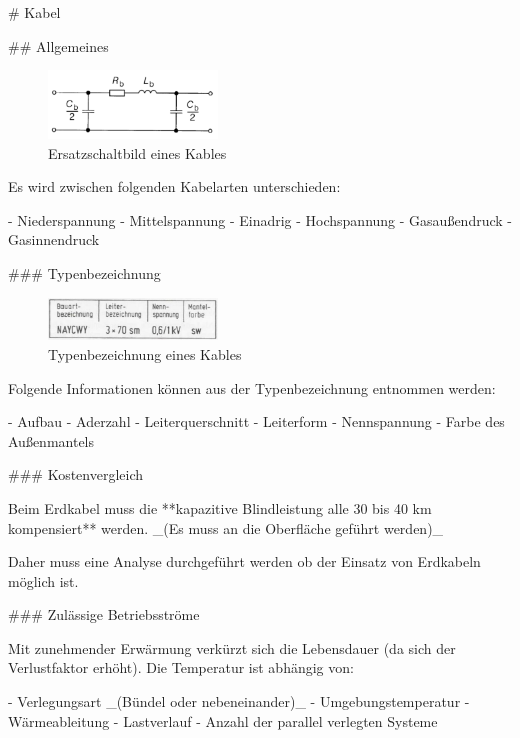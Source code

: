 \begin{markdown}
# Kabel

## Allgemeines

\begin{figure}
    \vspace{-1em}
    \centering
    \includegraphics[width=0.4\textwidth]{./images/09-Kabel/Ersatzschaltbild.png}
    \caption[Ersatzschaltbild eines Kables]{Ersatzschaltbild eines Kables}
\end{figure}

Es wird zwischen folgenden Kabelarten unterschieden:

- Niederspannung
- Mittelspannung
- Einadrig
- Hochspannung
    - Gasaußendruck
    - Gasinnendruck

### Typenbezeichnung

\begin{figure}
    \centering
    \includegraphics[width=0.4\textwidth]{./images/09-Kabel/Typenbezeichnung.png}
    \caption[Typenbezeichnung eines Kables]{Typenbezeichnung eines Kables}
\end{figure}

Folgende Informationen können aus der Typenbezeichnung entnommen werden:

- Aufbau
- Aderzahl
- Leiterquerschnitt
- Leiterform
- Nennspannung
- Farbe des Außenmantels

### Kostenvergleich


Beim Erdkabel muss die **kapazitive Blindleistung alle 30 bis 40 km kompensiert** werden. _(Es muss an die Oberfläche geführt werden)_

Daher muss eine Analyse durchgeführt werden ob der Einsatz von Erdkabeln möglich ist.

### Zulässige Betriebsströme


Mit zunehmender Erwärmung verkürzt sich die Lebensdauer (da sich der Verlustfaktor erhöht).
Die Temperatur ist abhängig von:

- Verlegungsart _(Bündel oder nebeneinander)_
- Umgebungstemperatur
- Wärmeableitung
- Lastverlauf
- Anzahl der parallel verlegten Systeme

\end{markdown}

